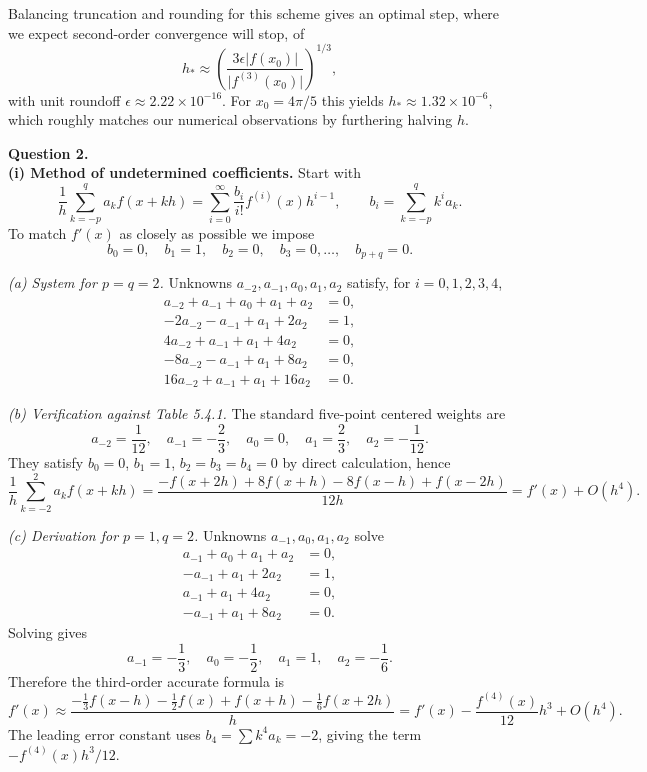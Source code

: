 \documentclass[11pt]{article}
\theoremstyle{definition}
\begin{document}
 Balancing truncation and rounding for this scheme gives an optimal step, where we expect second-order convergence will stop, of
\[
h_{\ast}\approx\left(\frac{3\epsilon\lvert f(x_{0})\rvert}{\lvert f^{(3)}(x_{0})\rvert}\right)^{1/3},
\]
with unit roundoff \(\epsilon\approx 2.22\times 10^{-16}\). For \(x_{0}=4\pi/5\) this yields \(h_{\ast}\approx 1.32\times 10^{-6}\), which roughly matches our numerical observations by furthering halving $h$.


\newpage



{\bf Question 2.}\\
\noindent \textbf{(i) Method of undetermined coefficients.}
Start with
\[
\frac{1}{h}\sum_{k=-p}^{q} a_{k} f(x+kh)
=\sum_{i=0}^{\infty} \frac{b_{i}}{i!} f^{(i)}(x) h^{i-1},
\qquad
b_{i}=\sum_{k=-p}^{q} k^{i} a_{k}.
\]
To match \(f'(x)\) as closely as possible we impose
\[
b_{0}=0,\quad b_{1}=1,\quad b_{2}=0,\quad b_{3}=0,\dots,\quad b_{p+q}=0.
\]

\noindent \emph{(a) System for \(p=q=2\).}
Unknowns \(a_{-2},a_{-1},a_{0},a_{1},a_{2}\) satisfy, for \(i=0,1,2,3,4\),
\[
\begin{aligned}
a_{-2}+a_{-1}+a_{0}+a_{1}+a_{2}&=0,\\
-2a_{-2}-a_{-1}+a_{1}+2a_{2}&=1,\\
4a_{-2}+a_{-1}+a_{1}+4a_{2}&=0,\\
-8a_{-2}-a_{-1}+a_{1}+8a_{2}&=0,\\
16a_{-2}+a_{-1}+a_{1}+16a_{2}&=0.
\end{aligned}
\]

\noindent \emph{(b) Verification against Table 5.4.1.}
The standard five-point centered weights are
\[
a_{-2}=\frac{1}{12},\quad a_{-1}=-\frac{2}{3},\quad a_{0}=0,\quad a_{1}=\frac{2}{3},\quad a_{2}=-\frac{1}{12}.
\]
They satisfy \(b_{0}=0\), \(b_{1}=1\), \(b_{2}=b_{3}=b_{4}=0\) by direct calculation, hence
\[
\frac{1}{h}\sum_{k=-2}^{2} a_{k} f(x+kh)
=\frac{-f(x+2h)+8f(x+h)-8f(x-h)+f(x-2h)}{12h}
=f'(x)+O(h^{4}).
\]

\noindent \emph{(c) Derivation for \(p=1,q=2\).}
Unknowns \(a_{-1},a_{0},a_{1},a_{2}\) solve
\[
\begin{aligned}
a_{-1}+a_{0}+a_{1}+a_{2}&=0,\\
-a_{-1}+a_{1}+2a_{2}&=1,\\
a_{-1}+a_{1}+4a_{2}&=0,\\
-a_{-1}+a_{1}+8a_{2}&=0.
\end{aligned}
\]
Solving gives
\[
a_{-1}=-\frac{1}{3},\quad a_{0}=-\frac{1}{2},\quad a_{1}=1,\quad a_{2}=-\frac{1}{6}.
\]
Therefore the third-order accurate formula is
\[
f'(x)\approx\frac{-\tfrac{1}{3}f(x-h)-\tfrac{1}{2}f(x)+f(x+h)-\tfrac{1}{6}f(x+2h)}{h}
=f'(x)-\frac{f^{(4)}(x)}{12}h^{3}+O(h^{4}).
\]
The leading error constant uses \(b_{4}=\sum k^{4}a_{k}=-2\), giving the term \(-f^{(4)}(x)h^{3}/12\).
\end{document}
